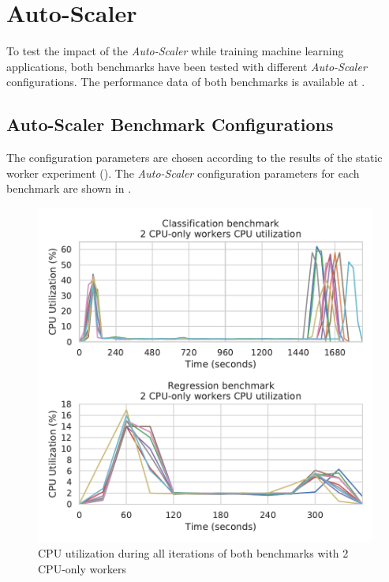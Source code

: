 \section{Auto-Scaler}
\label{sec:07_auto-scaler}
To test the impact of the \textit{Auto-Scaler} while training machine learning applications, both benchmarks have been tested with different \textit{Auto-Scaler} configurations.
The performance data of both benchmarks is available at .


\subsection{Auto-Scaler Benchmark Configurations}
The configuration parameters are chosen according to the results of the static worker experiment ().
The \textit{Auto-Scaler} configuration parameters for each benchmark are shown in .
\begin{figure}[h]
\centering
\includegraphics[scale=0.9]{images/07_evaluation/overall_auto-scaler_iterations}
\caption{CPU utilization during all iterations of both benchmarks with 2 CPU-only workers}
\label{fig:07_auto-scaler_iterations_results}
\end{figure}
